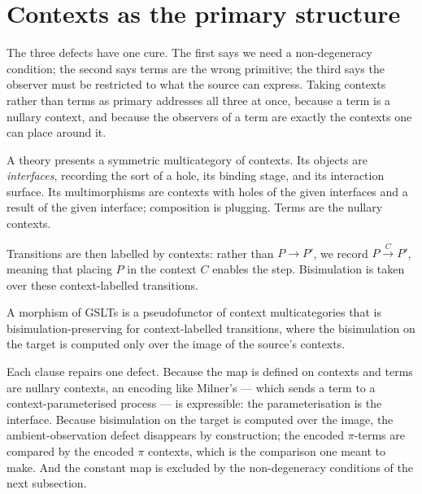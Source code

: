 \section{Contexts as the primary structure}

The three defects have one cure. The first says we need a non-degeneracy condition; the
second says terms are the wrong primitive; the third says the observer must be
restricted to what the source can express. Taking contexts rather than terms as primary
addresses all three at once, because a term is a nullary context, and because the
observers of a term are exactly the contexts one can place around it.

A theory presents a symmetric multicategory of contexts. Its objects are
\emph{interfaces}, recording the sort of a hole, its binding stage, and its interaction
surface. Its multimorphisms are contexts with holes of the given interfaces and a result
of the given interface; composition is plugging. Terms are the nullary contexts.

Transitions are then labelled by contexts: rather than $P \to P'$, we record
$P \xrightarrow{\;C\;} P'$, meaning that placing $P$ in the context $C$ enables the step.
Bisimulation is taken over these context-labelled transitions.

\begin{definition}
\label{ob:def:morphism}
A morphism of GSLTs is a pseudofunctor of context multicategories that is
bisimulation-preserving for context-labelled transitions, where the bisimulation on the
target is computed only over the image of the source's contexts.
\end{definition}

Each clause repairs one defect. Because the map is defined on contexts and terms are
nullary contexts, an encoding like Milner's --- which sends a term to a
context-parameterised process --- is expressible: the parameterisation is the interface.
Because bisimulation on the target is computed over the image, the ambient-observation
defect disappears by construction; the encoded $\pi$-terms are compared by the encoded
$\pi$ contexts, which is the comparison one meant to make. And the constant map is
excluded by the non-degeneracy conditions of the next subsection.

